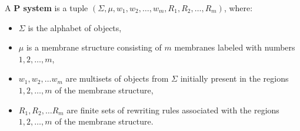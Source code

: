 A {\bf P system} is a tuple $(\Sigma, \mu, w_1, w_2,\dots , w_m, R_1, R_2, \dots , R_m)$, where:
\begin{itemize}
  \item $\Sigma$ is the alphabet of objects,
  \item $\mu$ is a membrane structure consisting of $m$ membranes labeled with numbers $1,2,\dots,m$,
  \item $w_1,w_2,\dots w_m$ are multisets of objects from $\Sigma$ initially present in the regions $1,2,\dots,m$ of the membrane structure,
  \item $R_1,R_2,\dots R_m$ are finite sets of rewriting rules associated with the regions $1,2,\dots,m$ of the membrane structure.
\end{itemize}
